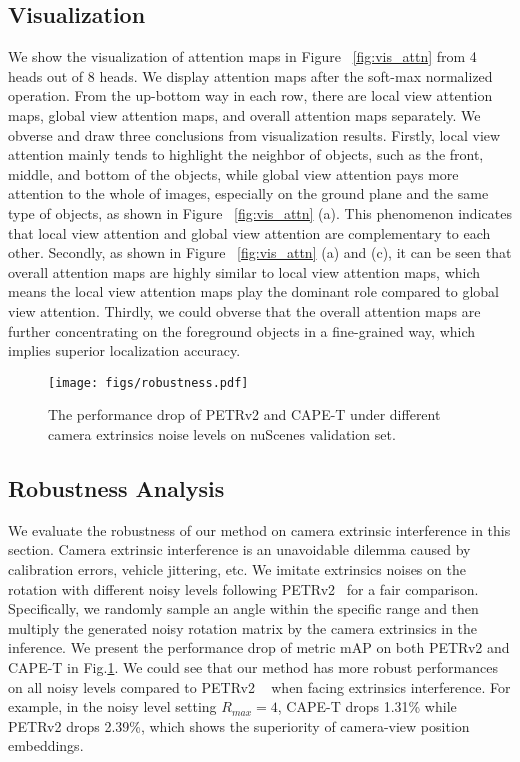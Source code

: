 \documentclass[10pt,twocolumn,letterpaper]{article}
\newcommand{\ourMethod}{CAPE}
\begin{document}
\subsection{Visualization} 
We show the visualization of attention maps in Figure ~\ref{fig:vis_attn} from 4 heads out of 8 heads. We display attention maps after the soft-max normalized operation. From the up-bottom way in each row, there are local view attention maps, global view attention maps, and overall attention maps separately. We obverse and draw three conclusions from visualization results. Firstly, local view attention mainly tends to highlight the neighbor of objects, such as the front, middle, and bottom of the objects, while global view attention pays more attention to the whole of images, especially on the ground plane and the same type of objects, as shown in  Figure ~\ref{fig:vis_attn} (a). 
This phenomenon indicates that local view attention and global view attention are complementary to each other. Secondly, as shown in Figure ~\ref{fig:vis_attn} (a) and (c), it can be seen that overall attention maps are highly similar to local view attention maps, which means the local view attention maps play the dominant role compared to global view attention. Thirdly, we could obverse that the overall attention maps are further concentrating on the foreground objects in a fine-grained way, which implies superior localization accuracy.


\begin{figure}[t]
\centering
\texttt{[image: figs/robustness.pdf]}
\vspace{-10pt}
\caption{The performance drop of PETRv2 and \ourMethod{}-T under different camera extrinsics noise levels on nuScenes validation set.}
\centering
\label{fig:robustness}
\vspace{-10pt}
\end{figure}

\subsection{Robustness Analysis}
We evaluate the robustness of our method on camera extrinsic interference in this section. Camera extrinsic interference is an unavoidable dilemma caused by calibration errors, vehicle jittering, etc. We imitate extrinsics noises on the rotation with different noisy levels following PETRv2~\cite{liu2022petrv2} for a fair comparison. Specifically, we randomly sample an angle within the specific range and then multiply the generated noisy rotation matrix by the camera extrinsics in the inference. We present the performance drop of metric mAP on both PETRv2 and \ourMethod{}-T in Fig.\ref{fig:robustness}. We could see that our method has more robust performances on all noisy levels compared to PETRv2 ~\cite{liu2022petrv2} when facing extrinsics interference. For example, in the noisy level setting $R_{max} = 4$, \ourMethod{}-T drops 1.31\% while PETRv2 drops 2.39\%, which shows the superiority of camera-view position embeddings. 
\end{document}
